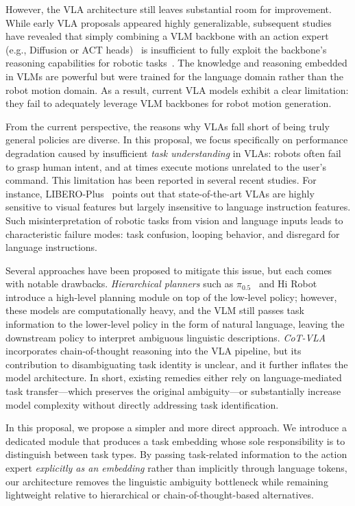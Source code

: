 \documentclass[11pt]{article}
\begin{document}
However, the VLA architecture still leaves substantial room for improvement. While early VLA proposals appeared highly generalizable, subsequent studies have revealed that simply combining a VLM backbone with an action expert (e.g., Diffusion or ACT heads)~\cite{diffusionpolicy, act} is insufficient to fully exploit the backbone's reasoning capabilities for robotic tasks~\cite{liberoplus}. The knowledge and reasoning embedded in VLMs are powerful but were trained for the language domain rather than the robot motion domain. As a result, current VLA models exhibit a clear limitation: they fail to adequately leverage VLM backbones for robot motion generation.

From the current perspective, the reasons why VLAs fall short of being truly general policies are diverse. In this proposal, we focus specifically on performance degradation caused by insufficient \emph{task understanding} in VLAs: robots often fail to grasp human intent, and at times execute motions unrelated to the user's command. This limitation has been reported in several recent studies. For instance, LIBERO-Plus~\cite{liberoplus} points out that state-of-the-art VLAs are highly sensitive to visual features but largely insensitive to language instruction features. Such misinterpretation of robotic tasks from vision and language inputs leads to characteristic failure modes: task confusion, looping behavior, and disregard for language instructions.

Several approaches have been proposed to mitigate this issue, but each comes with notable drawbacks. \emph{Hierarchical planners} such as $\pi_{0.5}$~\cite{pi05} and Hi Robot~\cite{hirobot} introduce a high-level planning module on top of the low-level policy; however, these models are computationally heavy, and the VLM still passes task information to the lower-level policy in the form of natural language, leaving the downstream policy to interpret ambiguous linguistic descriptions. \emph{CoT-VLA}~\cite{cotvla} incorporates chain-of-thought reasoning into the VLA pipeline, but its contribution to disambiguating task identity is unclear, and it further inflates the model architecture. In short, existing remedies either rely on language-mediated task transfer---which preserves the original ambiguity---or substantially increase model complexity without directly addressing task identification.

In this proposal, we propose a simpler and more direct approach. We introduce a dedicated module that produces a task embedding whose sole responsibility is to distinguish between task types. By passing task-related information to the action expert \emph{explicitly as an embedding} rather than implicitly through language tokens, our architecture removes the linguistic ambiguity bottleneck while remaining lightweight relative to hierarchical or chain-of-thought-based alternatives.
\end{document}
